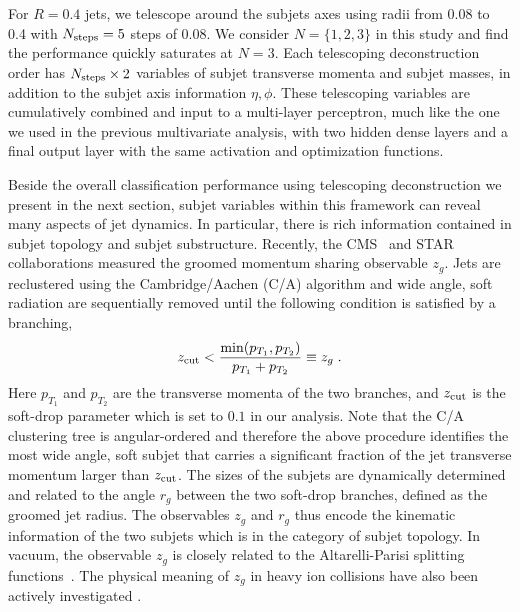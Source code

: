 \documentclass[notoc,preprintnumbers]{JHEP3}
\begin{document}
For $R=0.4$ jets, we telescope around the subjets axes using radii from 0.08 to 0.4 with $N_{\rm steps} = 5$ steps of 0.08. We consider $N=\{1,2,3\}$ in this study and find the performance quickly saturates at $N=3$. Each telescoping deconstruction order has $N_{\rm steps} \times 2$ variables of subjet transverse momenta and subjet masses, in addition to the subjet axis information $\eta, \phi$. %
These telescoping variables are cumulatively combined and input to a multi-layer perceptron, much like the one we used in the previous multivariate analysis, with two hidden dense layers and a final output layer with the same activation and optimization functions.

Beside the overall classification performance using telescoping deconstruction we present in the next section, subjet variables within this framework can reveal many aspects of jet dynamics. In particular, there is rich information contained in subjet topology and subjet substructure. Recently, the CMS~\cite{Sirunyan:2017bsd} and STAR~\cite{Kauder:2017mhg} collaborations measured the groomed momentum sharing observable $z_g$. Jets are reclustered using the Cambridge/Aachen (C/A) algorithm \cite{Dokshitzer:1997in,Wobisch:1998wt} and wide angle, soft radiation are sequentially removed until the following condition is satisfied by a branching,
\begin{equation}
    z_{\rm cut} < \frac{\min(p_{T_1},p_{T_2})}{p_{T_1}+p_{T_2}} \equiv z_g\;.
\label{SD}
\end{equation}
Here $p_{T_1}$ and $p_{T_2}$ are the transverse momenta of the two branches, and $z_{\rm cut}$ is the soft-drop parameter which is set to $0.1$ in our analysis. Note that the C/A clustering tree is angular-ordered and therefore the above procedure identifies the most wide angle, soft subjet that carries a significant fraction of the jet transverse momentum larger than $z_{\rm cut}$. The sizes of the subjets are dynamically determined and related to the angle $r_g$ between the two soft-drop branches, defined as the groomed jet radius. The observables $z_g$ and $r_g$ thus encode the kinematic information of the two subjets which is in the category of subjet topology. In vacuum, the observable $z_g$ is closely related to the Altarelli-Parisi splitting functions~\cite{Altarelli:1977zs}. The physical meaning of $z_g$ in heavy ion collisions have also been actively investigated \cite{Chien:2016led,Mehtar-Tani:2016aco,Milhano:2017nzm,Chang:2017gkt,Li:2017wwc}.
\end{document}
